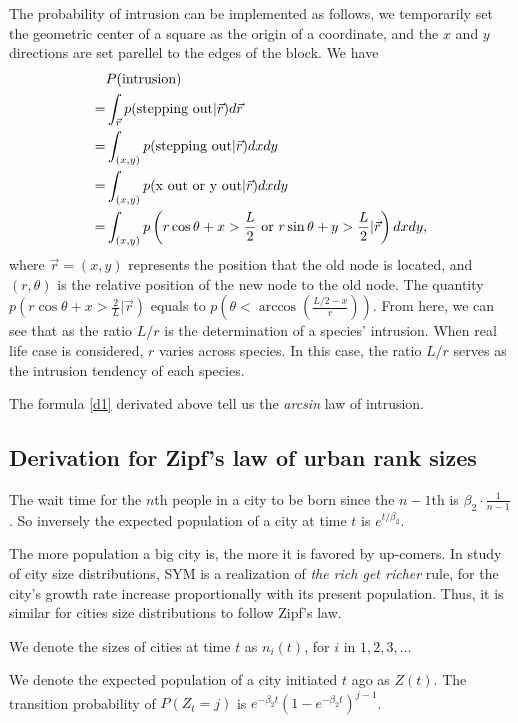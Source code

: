 \documentclass[aps,prl]{revtex4-2}
\begin{document}
The probability of intrusion can be implemented as follows, we temporarily set the geometric center of a square as the origin of a coordinate, and the $x$ and $y$ directions are set parellel to the edges of the block. We have 
\begin{align}
&P(\text{intrusion}) \\=& \int_{\vec{r}} p(\text{stepping out}|\vec{r})d\vec{r}\label{d1}\\
=& \int_{(x,y)} p(\text{stepping out}|\vec{r})dxdy    \notag \\
=& \int_{(x,y)}p(\text{x out or y out}|\vec{r})dxdy\notag
\\
=& \int_{(x,y)}p\left(r\cos\theta+x>\frac{L}{2}\text{ or }r\sin\theta+y>\frac{L}{2}|\vec{r}\right)dxdy,
\end{align}
where $\vec{r}=(x,y)$ represents the position that the old node is located, and $(r,\theta)$ is the relative position of the new node to the old node. The quantity $p\left(r\cos\theta+x>\frac{2}{L}|\vec{r}\right)$ equals to $p\left(\theta<\arccos\left(\frac{L/2-x}{r}\right)\right)$. From here, we can see that as the ratio $L/r$ is the determination of a species' intrusion. When  real life case is considered, $r$ varies across species. In this case, the ratio $L/r$ serves as the intrusion tendency of each species. 

The formula \@\ref{d1} derivated above tell us the \emph{arcsin} law of intrusion.

\subsection{Derivation for Zipf's law of urban rank sizes}

The wait time for the $n$th people in a city to be born since the $n-1$th is $\beta_2 \cdot \frac{1}{n-1}$. So inversely the expected population of a city at time $t$ is $e^{t/\beta_2}$. 

The more population a big city is, the more it is favored by up-comers. In study of city size distributions, SYM is a realization of \emph{the rich get richer} rule, for the city's growth rate increase proportionally with its present population. Thus, it is similar for cities size distributions to follow Zipf's law. 

We denote the sizes of cities at time $t$ as $n_i(t)$, for $i$ in $1,2,3,\dots$

We denote the expected population of a city initiated $t$ ago as $Z(t)$. The transition probability of $P(Z_t = j)$ is $e^{-\beta_2 t}(1-e^{-\beta_2 t})^{j-1}$. 
\end{document}
